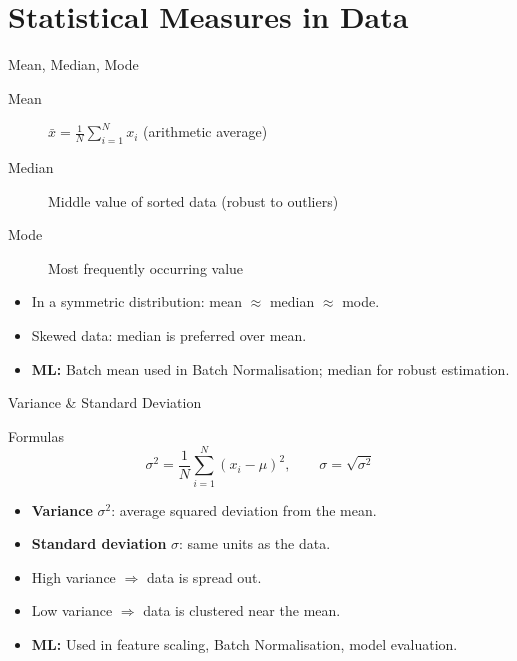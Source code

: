 \section{Statistical Measures in Data}

\begin{frame}{Mean, Median, Mode}
\begin{description}
    \item[Mean] $\displaystyle\bar{x} = \frac{1}{N}\sum_{i=1}^{N} x_i$ \quad (arithmetic average)
    \item[Median] Middle value of sorted data (robust to outliers)
    \item[Mode] Most frequently occurring value
\end{description}
\vspace{6pt}
\begin{itemize}
    \item In a symmetric distribution: mean $\approx$ median $\approx$ mode.
    \item Skewed data: median is preferred over mean.
    \item \textbf{ML:} Batch mean used in Batch Normalisation; median for robust estimation.
\end{itemize}
\end{frame}

\begin{frame}{Variance \& Standard Deviation}
\begin{block}{Formulas}
\[
\sigma^2 = \frac{1}{N}\sum_{i=1}^{N}(x_i - \mu)^2, \qquad \sigma = \sqrt{\sigma^2}
\]
\end{block}
\begin{itemize}
    \item \textbf{Variance} $\sigma^2$: average squared deviation from the mean.
    \item \textbf{Standard deviation} $\sigma$: same units as the data.
    \item High variance $\Rightarrow$ data is spread out.
    \item Low variance $\Rightarrow$ data is clustered near the mean.
    \item \textbf{ML:} Used in feature scaling, Batch Normalisation, model evaluation.
\end{itemize}
\end{frame}

